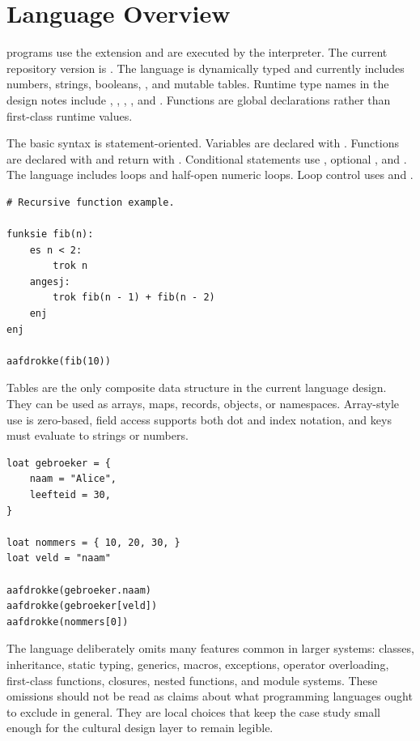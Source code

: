 \section{Language Overview}

\plat{} programs use the  extension and are executed by the
 interpreter. The current repository version is .
The language is dynamically typed and currently includes numbers, strings,
booleans, , and mutable  tables. Runtime type names in
the design notes include , , , ,
and . Functions are global declarations rather than first-class
runtime values.

The basic syntax is statement-oriented. Variables are declared with
. Functions are declared with  and return with
. Conditional statements use , optional , and
. The language includes  loops and half-open numeric
 loops. Loop control uses  and .

\begin{lstlisting}[caption={A recursive Fibonacci example from the repository.},label={lst:fib}]
# Recursive function example.

funksie fib(n):
    es n < 2:
        trok n
    angesj:
        trok fib(n - 1) + fib(n - 2)
    enj
enj

aafdrokke(fib(10))
\end{lstlisting}

Tables are the only composite data structure in the current language design.
They can be used as arrays, maps, records, objects, or namespaces. Array-style
use is zero-based, field access supports both dot and index notation, and keys
must evaluate to strings or numbers.

\begin{lstlisting}[caption={A table example based on the Limburgian-commented examples.},label={lst:tables}]
loat gebroeker = {
    naam = "Alice",
    leefteid = 30,
}

loat nommers = { 10, 20, 30, }
loat veld = "naam"

aafdrokke(gebroeker.naam)
aafdrokke(gebroeker[veld])
aafdrokke(nommers[0])
\end{lstlisting}

The language deliberately omits many features common in larger systems:
classes, inheritance, static typing, generics, macros, exceptions, operator
overloading, first-class functions, closures, nested functions, and module
systems. These omissions should not be read as claims about what programming
languages ought to exclude in general. They are local choices that keep the
case study small enough for the cultural design layer to remain legible.

